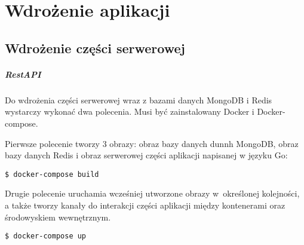 \chapter{Wdrożenie aplikacji}
\section{Wdrożenie części serwerowej}
\paragraph{RestAPI}

Do wdrożenia części serwerowej wraz z bazami danych MongoDB i Redis wystarczy wykonać dwa polecenia.
Musi być zainstalowany Docker i Docker-compose.

Pierwsze polecenie tworzy 3 obrazy: obraz bazy danych dunnh MongoDB, obraz bazy danych Redis i obraz serwerowej części aplikacji napisanej w języku Go:

\texttt{\$ docker-compose build}

Drugie polecenie uruchamia wcześniej utworzone obrazy w~określonej kolejności, a także tworzy kanały do interakcji części aplikacji między kontenerami oraz środowyskiem wewnętrznym.

\texttt{\$ docker-compose up}

